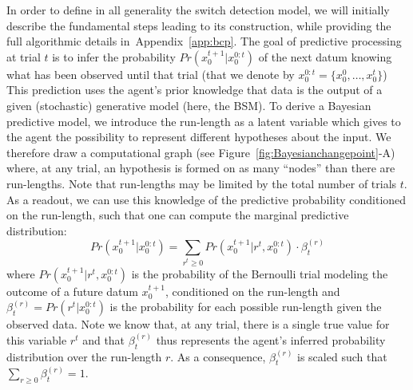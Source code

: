 \documentclass[10pt,letterpaper]{article}
\newcommand{\eql}[1]{\begin{equation}#1\end{equation}}
\newcommand{\seeFig}[1]{Figure~\ref{fig:#1}}
\newcommand{\seeEq}[1]{Equation~\ref{eq:#1}}
\newcommand{\seeApp}[1]{Appendix~\ref{app:#1}}
\begin{document}
In order to define in all generality the switch detection model,
we will initially describe the fundamental steps leading to its construction,
while providing the full algorithmic details in~\seeApp{bcp}.
The goal of predictive processing at trial $t$
is to infer the probability $Pr(x_0^{t+1} | x_0^{0:t})$ of the next datum
knowing what has been observed until that trial
(that we denote by $x_0^{0:t} = \{ x_0^0, \ldots, x_0^t \}$)
This prediction uses the agent's prior knowledge
that data is the output of a given (stochastic) generative model (here, the BSM).
To derive a Bayesian predictive model, we introduce
the run-length as a latent variable which gives to the agent the possibility to represent
different hypotheses about the input.
We therefore draw a computational graph (see \seeFig{Bayesianchangepoint}-A) where, at any trial,
an hypothesis is formed on as many ``nodes'' than there are run-lengths.
Note that run-lengths may be limited by the total number of trials $t$.
%
%
As a readout, we can use this knowledge of the predictive probability conditioned on the run-length,
such that one can compute the marginal predictive distribution:
\eql{
Pr(x_0^{t+1} | x_0^{0:t}) =
\sum_{r^{t}\geq 0} Pr(x_0^{t+1} | r^{t}, x_0^{0:t}) \cdot \beta^{(r)}_t
\label{eq:pred}
}
where $Pr(x_0^{t+1} | r^{t}, x_0^{0:t})$ is the probability of
the Bernoulli trial modeling the outcome of a future datum $x_0^{t+1}$,
conditioned on the run-length and
$\beta^{(r)}_t=Pr(r^t | x_0^{0:t})$ is the probability for each possible run-length given the observed data.
Note we know that, at any trial, there is a single true value for this variable $r^{t}$
and that $\beta^{(r)}_t$ thus represents the agent's inferred probability distribution over the run-length $r$.
As a consequence, $\beta^{(r)}_t$ is scaled such that $\sum_{r \geq 0 } \beta^{(r)}_t = 1$.
\end{document}
